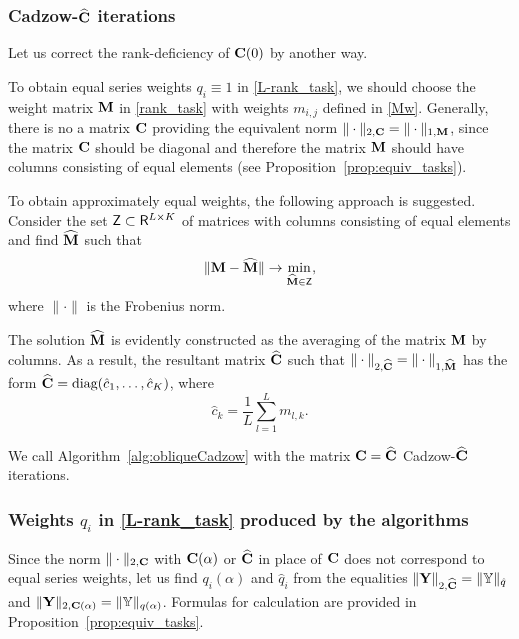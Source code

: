\documentclass[sii]{ipart}
\begin{document}
\subsubsection{Cadzow-$\widehat{\mathbf{C}}$ iterations}
\label{sec:cadzow_hat}
Let us correct the rank-deficiency of $\mathbf{C}(0)$ by another way.

To obtain equal series weights $q_i\equiv 1$ in \eqref{L-rank_task}, we
should choose the weight matrix $\mathbf{M}$ in \eqref{rank_task} with weights $m_{i,j}$ defined in \eqref{Mw}.
Generally, there is no a matrix $\mathbf{C}$ providing the equivalent norm
$\|\cdot\|_{2,\mathbf{C}}=\|\cdot\|_{1,\mathbf{M}}$, since the matrix $\mathbf{C}$ should
be diagonal and therefore the matrix $\mathbf{M}$ should have columns consisting of equal elements (see Proposition~\ref{prop:equiv_tasks}).

To obtain approximately equal weights, the following approach is suggested.
Consider the set $\mathsf{Z} \subset \mathsf{R}^{L \times K}$ of matrices with columns consisting of equal elements and find $\widehat{\mathbf{M}}$ such that
\begin{equation*}
\|\bfM - \widehat\bfM\| \to \min_{\widehat\bfM \in \sfZ},
\end{equation*}
where $\|\cdot\|$ is the Frobenius norm.

The solution $\widehat{\mathbf{M}}$ is evidently constructed as the averaging of the matrix $\mathbf{M}$ by columns. As a result, the resultant matrix $\widehat{\mathbf{C}}$ such that $\|\cdot\|_{2,\widehat{\mathbf{C}}}=\|\cdot\|_{1,\widehat{\mathbf{M}}}$ has the form $\widehat{\mathbf{C}} = \text{diag}(\hat c_1, \ldots, \hat c_K)$, where
\begin{equation}\label{my_s}
\hat c_k = \frac{1}{L}\sum_{l=1}^L m_{l, k}.
\end{equation}

We call Algorithm~\ref{alg:obliqueCadzow} with the matrix $\mathbf{C}=\widehat{\mathbf{C}}$ Cadzow-$\widehat{\mathbf{C}}$ iterations.

\subsubsection{Weights $q_i$ in \eqref{L-rank_task} produced by the algorithms}
Since the norm $\|\cdot\|_{2, \mathbf{C}}$ with $\mathbf{C}(\alpha)$ or $\widehat{\mathbf{C}}$ in place of $\mathbf{C}$ does not correspond to equal series weights,
let us find $q_i(\alpha)$ and $\hat{q}_i$ from the equalities
$\|\mathbf{Y}\|_{2,\widehat{\mathbf{C}}}=\|\mathbb{Y}\|_{\hat{q}}$ and $\|\mathbf{Y}\|_{2,\mathbf{C}(\alpha)}=\|\mathbb{Y}\|_{q(\alpha)}$.
Formulas for calculation are provided in Proposition~\ref{prop:equiv_tasks}.
\end{document}
